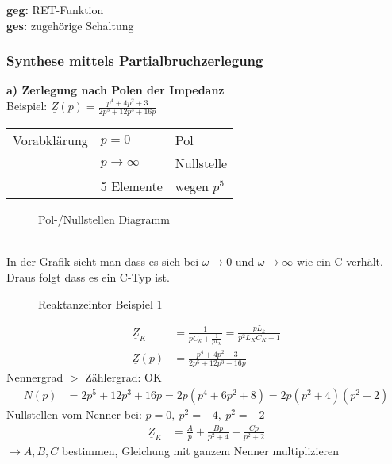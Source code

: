 

\textbf{geg:} RET-Funktion\\
\textbf{ges:} zugehörige Schaltung\\
\subsubsection{Synthese mittels Partialbruchzerlegung}
\textbf{a) Zerlegung nach Polen der Impedanz}\\
Beispiel: $\underline{Z}(p) = \frac{p^4+4p^2+3}{2p^5+12p^3+16p}$\\
\begin{tabular}{lll}
	Vorabklärung & $p=0$ & Pol \\
	& $p \rightarrow \infty$ & Nullstelle \\
	& 5 Elemente & wegen $p^5$ \\
\end{tabular}
\begin{figure}[!h]
	\centering
	
	\caption{Pol-/Nullstellen Diagramm}
	\label{fig:RetPolNullstelle}
\end{figure}\\
In der Grafik sieht man dass es sich bei $\omega \rightarrow 0$ und $\omega
\rightarrow \infty$ wie ein C verhält. Draus folgt dass es ein C-Typ ist.\\
\begin{figure}[!h]
	\centering
	
	\caption{Reaktanzeintor Beispiel 1}
	\label{fig:RetSyntheseBsp1S}
\end{figure}
\begin{align}
\underline{Z}_K&=\frac{1}{pC_k+\frac{1}{pL_k}} =
\frac{pL_k}{p^2L_KC_K+1}\nonumber\\
\underline{Z}(p)&=\frac{p^4+4p^2+3}{2p^5+12p^3+16p}\nonumber
\end{align}
Nennergrad $>$ Zählergrad: OK\\
\begin{align}
\underline{N}(p)&=2p^5+12p^3+16p=2p(p^4+6p^2+8)=2p(p^2+4)(p^2+2)\nonumber
\end{align}
Nullstellen vom Nenner bei: $p=0,\ p^2=-4,\ p^2=-2$\\
\begin{align}
\underline{Z}_K&=\frac{A}{p}+\frac{Bp}{p^2+4}+\frac{Cp}{p^2+2}\nonumber
\end{align}
$\rightarrow A,B,C$ bestimmen, Gleichung mit ganzem Nenner multiplizieren\\
